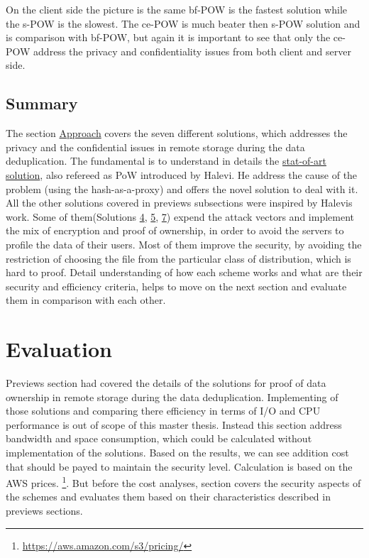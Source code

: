\documentclass[12pt]{article}
\begin{document}
On the client side the picture is the same bf-POW is the fastest solution while the s-POW is the slowest. The ce-POW is much beater then s-POW solution and is comparison with bf-POW, but again it is important to see that only the ce-POW address the privacy and confidentiality issues from both client and server side.


\subsection{Summary}
\label{subsub:ApproachSummary}

The section \hyperref[sec:4]{Approach} covers the seven different solutions, which addresses the privacy and the confidential issues in remote storage during the data deduplication. The fundamental is to understand in details  the \hyperref[sub:Soltuion1]{stat-of-art solution}, also refereed as PoW introduced by Halevi. He address the cause of the problem (using the hash-as-a-proxy) and offers the novel solution to deal with it. All the other solutions covered in previews subsections were inspired by Halevis work. Some of them(Solutions \hyperref[sub:Soltuion4]{4}, \hyperref[sub:Soltuion4]{5}, \hyperref[sub:Soltuion4]{7}) expend the  attack vectors and implement the mix of encryption and proof of ownership, in order to avoid the servers to profile the data of their users. Most of them improve the security, by avoiding the restriction of choosing the file from the particular class of distribution, which is hard to proof. Detail understanding of how each scheme works and what are their security and efficiency criteria, helps to move on the next section and evaluate them in comparison with each other.  

\pagebreak

\section{Evaluation}
\label{sec:5}
Previews section had covered the details of the solutions for proof of data ownership in remote storage during the data deduplication. Implementing of those solutions and comparing there efficiency in terms of I/O and CPU performance is out of scope of this master thesis. Instead this section address bandwidth and space consumption, which could be calculated without implementation of the solutions. Based on the results, we can see addition cost that should be payed to maintain the security level. Calculation is  based on the AWS prices. \footnote{\url{https://aws.amazon.com/s3/pricing/}}. But before the cost analyses, section covers the security aspects of the schemes and evaluates them based on their characteristics described in previews sections.
\end{document}
